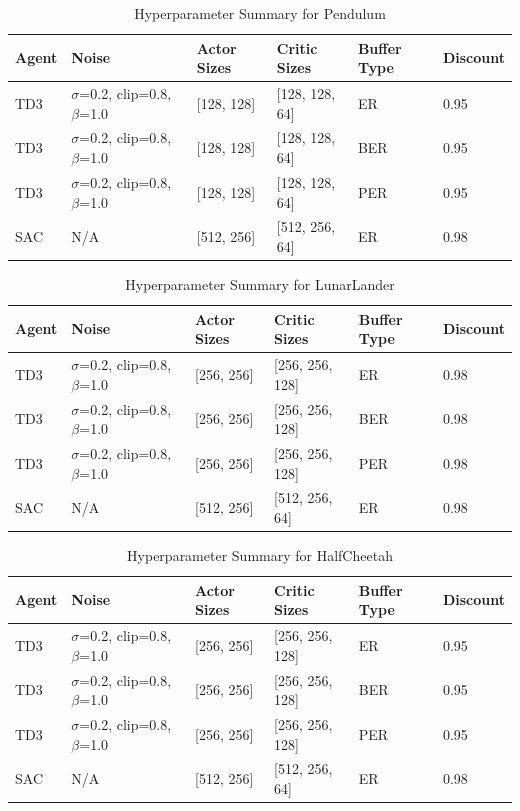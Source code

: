 \begin{table}[H]
\caption{Hyperparameter Summary for Pendulum }\centering {}
\label{tab:hyperparameters_pendulum}
\begin{tabular}{llllll}
\toprule
Agent & Noise & Actor Sizes & Critic Sizes & Buffer Type & Discount \\
\midrule
TD3 & $\sigma$=0.2, clip=0.8, $\beta$=1.0 & [128, 128] & [128, 128, 64] & ER & 0.95 \\
TD3 & $\sigma$=0.2, clip=0.8, $\beta$=1.0 & [128, 128] & [128, 128, 64] & BER & 0.95 \\
TD3 & $\sigma$=0.2, clip=0.8, $\beta$=1.0 & [128, 128] & [128, 128, 64] & PER & 0.95 \\
SAC & N/A & [512, 256] & [512, 256, 64] & ER & 0.98 \\
\bottomrule
\end{tabular}
\end{table}


\begin{table}[H]
\caption{Hyperparameter Summary for LunarLander }\centering {}
\label{tab:hyperparameters_lunarlander}
\begin{tabular}{llllll}
\toprule
Agent & Noise & Actor Sizes & Critic Sizes & Buffer Type & Discount \\
\midrule
TD3 & $\sigma$=0.2, clip=0.8, $\beta$=1.0 & [256, 256] & [256, 256, 128] & ER & 0.98 \\
TD3 & $\sigma$=0.2, clip=0.8, $\beta$=1.0 & [256, 256] & [256, 256, 128] & BER & 0.98 \\
TD3 & $\sigma$=0.2, clip=0.8, $\beta$=1.0 & [256, 256] & [256, 256, 128] & PER & 0.98 \\
SAC & N/A & [512, 256] & [512, 256, 64] & ER & 0.98 \\
\bottomrule
\end{tabular}
\end{table}


\begin{table}[H]
\caption{Hyperparameter Summary for HalfCheetah }\centering {}
\label{tab:hyperparameters_halfcheetah}
\begin{tabular}{llllll}
\toprule
Agent & Noise & Actor Sizes & Critic Sizes & Buffer Type & Discount \\
\midrule
TD3 & $\sigma$=0.2, clip=0.8, $\beta$=1.0 & [256, 256] & [256, 256, 128] & ER & 0.95 \\
TD3 & $\sigma$=0.2, clip=0.8, $\beta$=1.0 & [256, 256] & [256, 256, 128] & BER & 0.95 \\
TD3 & $\sigma$=0.2, clip=0.8, $\beta$=1.0 & [256, 256] & [256, 256, 128] & PER & 0.95 \\
SAC & N/A & [512, 256] & [512, 256, 64] & ER & 0.98 \\
\bottomrule
\end{tabular}
\end{table}
